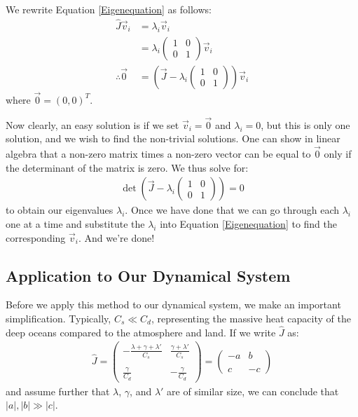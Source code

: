 We rewrite Equation \ref{Eigenequation} as follows:
\begin{align*}
    \hat{J}\vec{v}_i&=\lambda_i\vec{v}_i\\
    &=\lambda_i\left( \begin{array}{cc}
        1 & 0 \\
        0 & 1
    \end{array} \right)\vec{v}_i\\
    \therefore \vec{0} & = \left( 
        \vec{J} - \lambda_i \left( \begin{array}{cc}
        1 & 0 \\
        0 & 1
    \end{array} \right)
    \right)\vec{v}_i
\end{align*}
where $\vec{0}=(0,0)^T$. 

Now clearly, an easy solution is if we set $\vec{v}_i=\vec{0}$ and $\lambda_i=0$, but this is only one solution, and we wish to find the non-trivial solutions. One can show in linear algebra that a non-zero matrix times a non-zero vector can be equal to $\vec{0}$ only if the determinant of the matrix is zero. We thus solve for:
\begin{align*}
    \det\left( 
        \vec{J} - \lambda_i \left( \begin{array}{cc}
        1 & 0 \\
        0 & 1
    \end{array} \right)
    \right)=0
\end{align*}
to obtain our eigenvalues $\lambda_i$. Once we have done that we can go through each $\lambda_i$ one at a time and substitute the $\lambda_i$ into Equation \ref{Eigenequation} to find the corresponding $\vec{v}_i$. And we're done!

\subsection{Application to Our Dynamical System}\label{App to Dym}

Before we apply this method to our dynamical system, we make an important simplification. Typically, $C_s\ll C_d$, representing the massive heat capacity of the deep oceans compared to the atmosphere and land. If we write $\hat{J}$ as:
\begin{align*}
    \hat{J}=\left( \begin{array}{cc}
        -\frac{\lambda+\gamma+\lambda'}{C_s} & \frac{\gamma+\lambda'}{C_s} \\\\
        \frac{\gamma}{C_d} & -\frac{\gamma}{C_d}
    \end{array}
    \right)
    =\left( \begin{array}{cc}
        -a & b \\\\
        c & -c
    \end{array}
    \right)
\end{align*}
and assume further that $\lambda$, $\gamma$, and $\lambda'$ are of similar size, we can conclude that $|a|,|b|\gg |c|$. 

